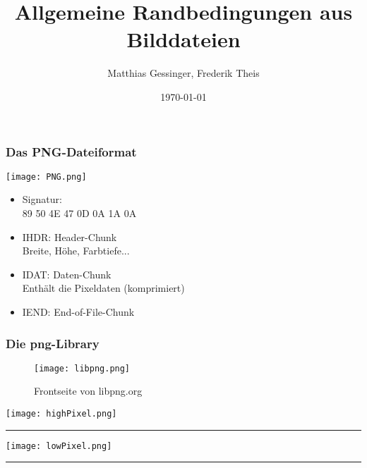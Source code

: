 \documentclass{beamer}
\author{Matthias Gessinger, Frederik Theis}
\date{\today}
\title{Allgemeine Randbedingungen aus Bilddateien}
\institute{Uni Bonn, Strömungspraktikum}
\begin{document}
\begin{frame}
\maketitle
\end{frame}

\begin{frame}
    \frametitle{Das PNG-Dateiformat}
    \begin{minipage}[c]{0.48\textwidth}
        \texttt{[image: PNG.png]}
    \end{minipage}
    \begin{minipage}[c]{0.48\textwidth}
        \begin{itemize}
            \item<1-> Signatur: \\
                  89  50  4E  47  0D  0A  1A  0A
            \item<2-> IHDR: Header-Chunk \\
                  Breite, Höhe, Farbtiefe...
            \item<3-> IDAT: Daten-Chunk \\
                  Enthält die Pixeldaten (komprimiert)
            \item<4> IEND: End-of-File-Chunk
        \end{itemize}
    \end{minipage}
\end{frame}

\begin{frame}
    \frametitle{Die png-Library}
    \begin{figure}
        \texttt{[image: libpng.png]}
        \caption{Frontseite von libpng.org}
    \end{figure}
\end{frame}

\begin{frame}
    \texttt{[image: highPixel.png]}
    \hrule
    \texttt{[image: lowPixel.png]}
    \hrule
\end{frame}
\end{document}
